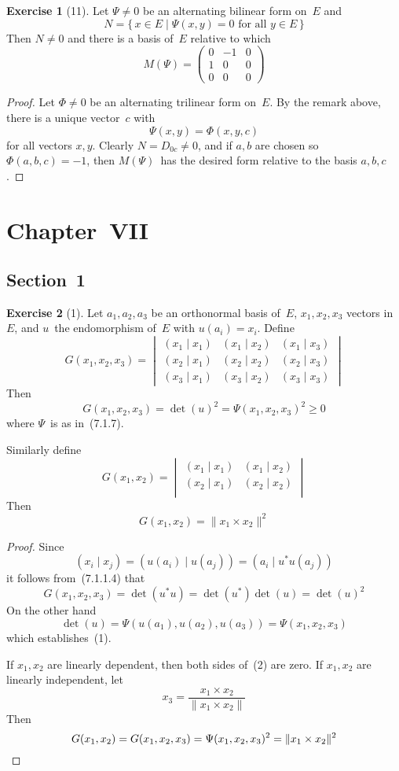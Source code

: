 \documentclass[letterpaper,12pt]{article}
\newcommand{\cross}{\times}
\newcommand{\norm}[1]{\lVert{#1}\rVert}
\newcommand{\innerprod}[2]{({#1}\;|\;{#2})}
\newcommand{\adj}[1]{#1^*}
\theoremstyle{definition}
\newtheorem*{exer}{Exercise}
\theoremstyle{remark}
\begin{document}
\begin{exer}[11]
Let \(\Psi\ne0\) be an alternating bilinear form on~\(E\) and
\[N=\{\,x\in E\mid \Psi(x,y)=0\text{ for all }y\in E\,\}\]
Then \(N\ne 0\) and there is a basis of~\(E\) relative to which
\[M(\Psi)=\begin{pmatrix}
0&-1&0\\
1&0&0\\
0&0&0
\end{pmatrix}\]
\end{exer}
\begin{proof}
Let \(\Phi\ne0\) be an alternating trilinear form on~\(E\). By the remark above, there is a unique vector~\(c\) with
\[\Psi(x,y)=\Phi(x,y,c)\]
for all vectors \(x,y\). Clearly \(N=D_{0c}\ne0\), and if \(a,b\) are chosen so \(\Phi(a,b,c)=-1\), then \(M(\Psi)\)~has the desired form relative to the basis \(a,b,c\).
\end{proof}

\section*{Chapter~VII}
\subsection*{Section~1}
\begin{exer}[1]
Let \(a_1,a_2,a_3\) be an orthonormal basis of~\(E\), \(x_1,x_2,x_3\) vectors in~\(E\), and \(u\)~the endomorphism of~\(E\) with \(u(a_i)=x_i\). Define
\[G(x_1,x_2,x_3)=\begin{vmatrix}
\innerprod{x_1}{x_1}&\innerprod{x_1}{x_2}&\innerprod{x_1}{x_3}\\
\innerprod{x_2}{x_1}&\innerprod{x_2}{x_2}&\innerprod{x_2}{x_3}\\
\innerprod{x_3}{x_1}&\innerprod{x_3}{x_2}&\innerprod{x_3}{x_3}
\end{vmatrix}\]
Then
\[G(x_1,x_2,x_3)=\det(u)^2=\Psi(x_1,x_2,x_3)^2\ge0\tag{1}\]
where \(\Psi\)~is as in~(7.1.7).

Similarly define
\[G(x_1,x_2)=\begin{vmatrix}
\innerprod{x_1}{x_1}&\innerprod{x_1}{x_2}\\
\innerprod{x_2}{x_1}&\innerprod{x_2}{x_2}\\
\end{vmatrix}\]
Then
\[G(x_1,x_2)=\norm{x_1\cross x_2}^2\tag{2}\]
\end{exer}
\begin{proof}
Since
\[\innerprod{x_i}{x_j}=\innerprod{u(a_i)}{u(a_j)}=\innerprod{a_i}{\adj{u}u(a_j)}\]
it follows from~(7.1.1.4) that
\[G(x_1,x_2,x_3)=\det(\adj{u}u)=\det(\adj{u})\det(u)=\det(u)^2\]
On the other hand
\[\det(u)=\Psi(u(a_1),u(a_2),u(a_3))=\Psi(x_1,x_2,x_3)\]
which establishes~(1).

If \(x_1,x_2\) are linearly dependent, then both sides of~(2) are zero. If \(x_1,x_2\) are linearly independent, let
\[x_3=\frac{x_1\cross x_2}{\norm{x_1\cross x_2}}\]
Then
\[G(x_1,x_2)=G(x_1,x_2,x_3)=\Psi(x_1,x_2,x_3)^2=\norm{x_1\cross x_2}^2\qedhere\]
\end{proof}
\end{document}
